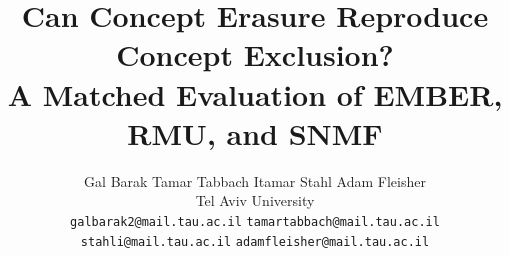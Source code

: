 \documentclass[11pt]{article}
\title{Can Concept Erasure Reproduce Concept Exclusion?\\
A Matched Evaluation of EMBER, RMU, and SNMF}
\author{
    Gal Barak \quad Tamar Tabbach \quad Itamar Stahl \quad Adam Fleisher \\
  Tel Aviv University \\
  \texttt{galbarak2@mail.tau.ac.il} \quad
  \texttt{tamartabbach@mail.tau.ac.il} \\
  \texttt{stahli@mail.tau.ac.il} \quad
  \texttt{adamfleisher@mail.tau.ac.il}
}
\begin{document}
\maketitle
\begin{abstract}

\end{abstract}










\clearpage
\appendix

\end{document}
